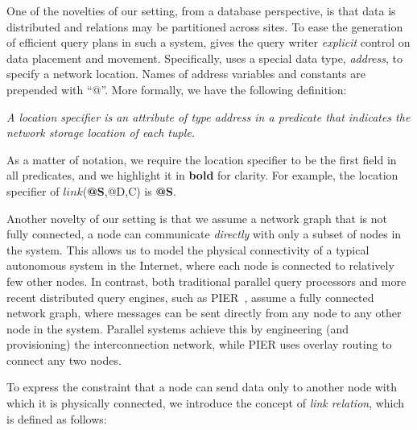 One of the novelties of our setting, from a database perspective, is
that data is distributed and relations may be partitioned across
sites.  To ease the generation of efficient query plans in such a
system, \Dlog gives the query writer {\em explicit} control on data
placement and movement. Specifically, \Dlog uses a special data type,
{\em address}, to specify a network location.  Names of address
variables and constants are prepended with ``@''.  More formally, we
have the following definition:

\begin{Def}{\em A {\em location specifier} is an attribute of type
    address in a predicate that indicates the network storage
    location of each tuple.}
\end{Def}

As a matter of notation, we require the location specifier to be the
first field in all predicates, and we highlight it in {\bf bold} for
clarity. For example, the location specifier of $link$({\bf @S},@D,C) is {\bf @S}.

Another novelty of our setting is that we assume a network graph that
is not fully connected, \ie a node can communicate {\em directly}
with only a subset of nodes in the system.  This allows us to model
the physical connectivity of a typical autonomous system in the
Internet, where each node is connected to relatively few other nodes.
In contrast, both traditional parallel query processors and more
recent distributed query engines, such as PIER~\cite{pierCidr}, assume a
fully connected network graph, where messages can be sent directly
from any node to any other node in the system.  Parallel systems
achieve this by engineering (and provisioning) the interconnection
network, while PIER uses overlay routing to connect any two nodes.


To express the constraint that a node can send data only to another node with which it is
physically connected, we introduce the concept of {\em link relation},
which is defined as follows:


